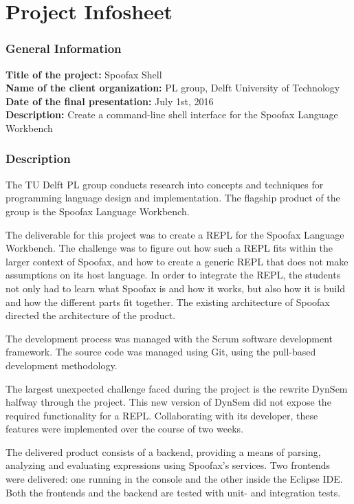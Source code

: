 \chapter{Project Infosheet}
\label{cha:infosheet}
\newpage

\noindent
\subsection*{General Information}

\textbf{Title of the project:} Spoofax Shell\\
\textbf{Name of the client organization:} PL group, Delft University of Technology\\
\textbf{Date of the final presentation:} July 1st, 2016\\
\textbf{Description:} Create a command-line shell interface for the Spoofax
Language Workbench

\subsection*{Description}

The TU Delft PL group conducts research into concepts and techniques for
programming language design and implementation. The flagship product of the
group is the Spoofax Language Workbench.

The deliverable for this project was to create a REPL for the Spoofax Language
Workbench. The challenge was to figure out how such a REPL fits within the larger
context of Spoofax, and how to create a generic REPL that does not make assumptions
on its host language. In order to integrate the REPL, the students not only had
to learn what Spoofax is and how it works, but also how it is build and how the
different parts fit together. The existing architecture of Spoofax directed the
architecture of the product.

The development process was managed with the Scrum software development
framework. The source code was managed using Git, using the pull-based
development methodology.

The largest unexpected challenge faced during the project is the rewrite DynSem
halfway through the project. This new version of DynSem did not expose the
required functionality for a REPL. Collaborating with its developer, these
features were implemented over the course of two weeks.

The delivered product consists of a backend, providing a means of parsing,
analyzing and evaluating expressions using Spoofax's services. Two frontends
were delivered: one running in the console and the other inside the Eclipse IDE.
Both the frontends and the backend are tested with unit- and integration tests.

